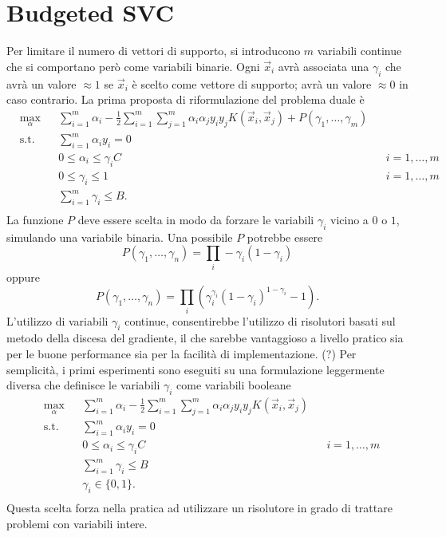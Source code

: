 \section{Budgeted SVC}\label{sec:our_budgeted_svm}
Per limitare il numero di vettori di supporto, si introducono $m$ variabili continue che si comportano però come variabili binarie. Ogni $\Vec{x}_i$ avrà associata una $\gamma_i$ che avrà un valore $\approx1$ se $\Vec{x}_i$ è scelto come vettore di supporto; avrà un valore $\approx0$ in caso contrario.
La prima proposta di riformulazione del problema duale è
\begin{equation}\label{eq:budget_svc:continuous_gamma_formulation}
\begin{aligned}
& \max_{\alpha}    && \sum_{i=1}^{m}\alpha_i - \frac{1}{2}\sum_{i=1}^{m}\sum_{j=1}^{m}\alpha_i\alpha_jy_iy_jK(\Vec{x}_i, \Vec{x}_j) +P(\gamma_1, \dots, \gamma_m)\\
& \textrm{s.t.} && \sum_{i=1}^{m} \alpha_iy_i = 0                   \\
&               && 0 \leq \alpha_i \leq \gamma_iC   && i=1,\dots,m  \\
&               && 0 \leq \gamma_i \leq 1           && i=1, \dots, m\\
&               && \sum_{i=1}^{m} \gamma_i \leq B.                   \\
\end{aligned}
\end{equation}
La funzione $P$ deve essere scelta in modo da forzare le variabili $\gamma_i$ vicino a $0$ o $1$, simulando una variabile binaria.
Una possibile $P$ potrebbe essere 
$$P(\gamma_1, \dots, \gamma_n) = \prod_i -\gamma_i (1 - \gamma_i)$$
oppure 
$$P(\gamma_1, \dots, \gamma_n) = \prod_i \left( \gamma_i^{\gamma_i} (1 - \gamma_i)^{1 - \gamma_i} - 1 \right).$$
%
%
L'utilizzo di variabili $\gamma_i$ continue, consentirebbe l'utilizzo di risolutori basati sul metodo della discesa del gradiente, il che sarebbe vantaggioso a livello pratico sia per le buone performance sia per la facilità di implementazione. (?)
Per semplicità, i primi esperimenti sono eseguiti su una formulazione leggermente diversa che definisce le variabili $\gamma_i$ come variabili booleane
\begin{equation}\label{eq:budget_svc:binary_gamma_formulation}
\begin{aligned}
& \max_{\alpha}    && \sum_{i=1}^{m}\alpha_i - \frac{1}{2}\sum_{i=1}^{m}\sum_{j=1}^{m}\alpha_i\alpha_jy_iy_jK(\Vec{x}_i, \Vec{x}_j)\\
& \textrm{s.t.} && \sum_{i=1}^{m} \alpha_iy_i = 0                   \\
&               && 0 \leq \alpha_i \leq \gamma_iC   && i=1,\dots,m  \\
&               && \sum_{i=1}^{m} \gamma_i \leq B                   \\
&               && \gamma_i \in \{0,1\}.                            \\
\end{aligned}
\end{equation}
Questa scelta forza nella pratica ad utilizzare un risolutore in grado di trattare problemi con variabili intere.


